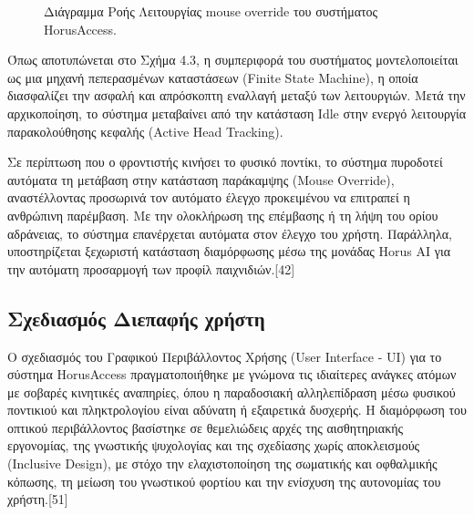 \documentclass[twoside, a4paper, 11pt]{article}
\begin{document}
\begin{figure}[H]
{%
    }
    \caption{Διάγραμμα Ροής Λειτουργίας mouse override του συστήματος HorusAccess.}
    \label{fig:flowchart}
\end{figure}


Όπως αποτυπώνεται στο Σχήμα 4.3, η συμπεριφορά του συστήματος μοντελοποιείται ως μια μηχανή πεπερασμένων καταστάσεων (Finite State Machine), η οποία διασφαλίζει την ασφαλή και απρόσκοπτη εναλλαγή μεταξύ των λειτουργιών. Μετά την αρχικοποίηση, το σύστημα μεταβαίνει από την κατάσταση Idle στην ενεργό λειτουργία παρακολούθησης κεφαλής (Active Head Tracking).

Σε περίπτωση που ο φροντιστής κινήσει το φυσικό ποντίκι, το σύστημα πυροδοτεί αυτόματα τη μετάβαση στην κατάσταση παράκαμψης (Mouse Override), αναστέλλοντας προσωρινά τον αυτόματο έλεγχο προκειμένου να επιτραπεί η ανθρώπινη παρέμβαση. Με την ολοκλήρωση της επέμβασης ή τη λήψη του ορίου αδράνειας, το σύστημα επανέρχεται αυτόματα στον έλεγχο του χρήστη. Παράλληλα, υποστηρίζεται ξεχωριστή κατάσταση διαμόρφωσης μέσω της μονάδας Horus AI για την αυτόματη προσαρμογή των προφίλ παιχνιδιών.[42]

\subsection{Σχεδιασμός Διεπαφής χρήστη}
Ο σχεδιασμός του Γραφικού Περιβάλλοντος Χρήσης (User Interface - UI) για το σύστημα HorusAccess πραγματοποιήθηκε με γνώμονα τις 
ιδιαίτερες ανάγκες ατόμων με σοβαρές κινητικές αναπηρίες, όπου η παραδοσιακή αλληλεπίδραση μέσω φυσικού ποντικιού και πληκτρολογίου 
είναι αδύνατη ή εξαιρετικά δυσχερής. Η διαμόρφωση του οπτικού περιβάλλοντος βασίστηκε σε θεμελιώδεις αρχές της αισθητηριακής εργονομίας, 
της γνωστικής ψυχολογίας και της σχεδίασης χωρίς αποκλεισμούς (Inclusive Design), με στόχο την ελαχιστοποίηση της σωματικής και οφθαλμικής κόπωσης, 
τη μείωση του γνωστικού φορτίου και την ενίσχυση της αυτονομίας του χρήστη.[51]
\end{document}
